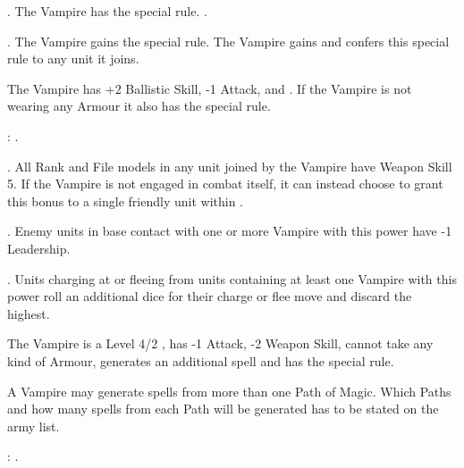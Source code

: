 \textbf{\bloodlinepower}. The Vampire has the  special rule. .

 \textbf{\bloodlinepower}. The Vampire gains the \awaken{\zombies , \direwolves , \batswarms , \greatbats} special rule. The Vampire gains \swiftstride{} and confers this special rule to any unit it joins.

\endpricelist

\separator


The Vampire has +2 Ballistic Skill, -1 Attack, \lightningreflexes{} and \throwingweapons{}. If the Vampire is not wearing any Armour it also has the \distracting{} special rule.

\bloodties{}: \courtofthedamned .

\startpricelist

 \textbf{\ancientbloodpower}. All Rank and File models in any unit joined by the Vampire have Weapon Skill 5. If the Vampire is not engaged in combat itself, it can instead choose to grant this bonus to a single friendly unit within .

 \textbf{\bloodlinepower}. Enemy units in base contact with one or more Vampire with this power have -1 Leadership.

 \textbf{\bloodlinepower}. Units charging at or fleeing from units containing at least one Vampire with this power roll an additional dice for their charge or flee move and discard the highest.

\endpricelist

\separator


The Vampire is a Level 4/2 \wizard{}, has -1 Attack, -2 Weapon Skill, cannot take any kind of Armour, generates an additional spell and has the \awaken{\zombies , \skeletons} special rule.

A \nosferatu Vampire may generate spells from more than one Path of Magic. Which Paths and how many spells from each Path will be generated has to be stated on the army list.

\bloodties{}: \wraiths .

